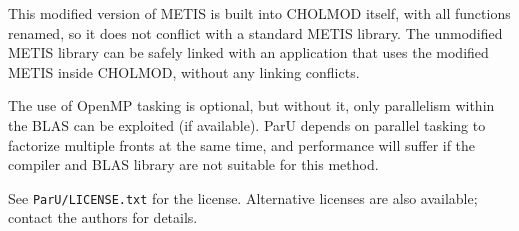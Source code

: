 \documentclass[12pt]{article}
\begin{document}
This modified version of METIS is built into CHOLMOD itself, with all
functions renamed, so it does not conflict with a standard METIS library.
The unmodified METIS library can be safely linked with an application that
uses the modified METIS inside CHOLMOD, without any linking conflicts.

The use of OpenMP tasking is optional, but without it, only parallelism within
the BLAS can be exploited (if available).  ParU depends on parallel tasking to
factorize multiple fronts at the same time, and performance will suffer if the
compiler and BLAS library are not suitable for this method.

See \verb'ParU/LICENSE.txt' for the license.  Alternative licenses are also
available; contact the authors for details.




\end{document}
